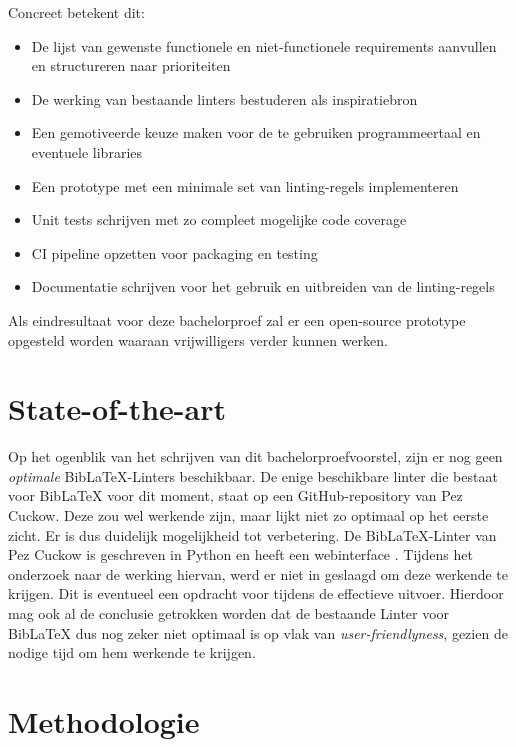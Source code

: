 Concreet betekent dit:
\begin{itemize}
  \item De lijst van gewenste functionele en niet-functionele requirements aanvullen en structureren naar prioriteiten
  \item De werking van bestaande linters bestuderen als inspiratiebron
  \item Een gemotiveerde keuze maken voor de te gebruiken programmeertaal en eventuele libraries
  \item Een prototype met een minimale set van linting-regels implementeren
  \item Unit tests schrijven met zo compleet mogelijke code coverage
  \item CI pipeline opzetten voor packaging en testing
  \item Documentatie schrijven voor het gebruik en uitbreiden van de linting-regels
\end{itemize}

Als eindresultaat voor deze bachelorproef zal er een open-source prototype opgesteld worden waaraan vrijwilligers verder kunnen werken.



\section{State-of-the-art}%
\label{sec:state-of-the-art}

Op het ogenblik van het schrijven van dit bachelorproefvoorstel, zijn er nog geen \emph{optimale} BibLaTeX-Linters beschikbaar. De enige beschikbare linter die bestaat voor BibLaTeX voor dit moment, 
staat op een GitHub-repository van Pez Cuckow. Deze zou wel werkende zijn, maar lijkt niet zo optimaal op het eerste zicht. Er is dus duidelijk mogelijkheid tot verbetering. De BibLaTeX-Linter van Pez Cuckow
is geschreven in Python en heeft een webinterface \autocite{Cuckow2022}. Tijdens het onderzoek naar de werking hiervan, werd er niet in geslaagd om deze werkende te krijgen. Dit is eventueel een opdracht voor tijdens 
de effectieve uitvoer. Hierdoor mag ook al de conclusie getrokken worden dat de bestaande Linter voor BibLaTeX dus nog zeker niet optimaal is op vlak van \emph{user-friendlyness}, gezien de nodige tijd om hem werkende te krijgen.


\section{Methodologie}%
\label{sec:methodologie}

